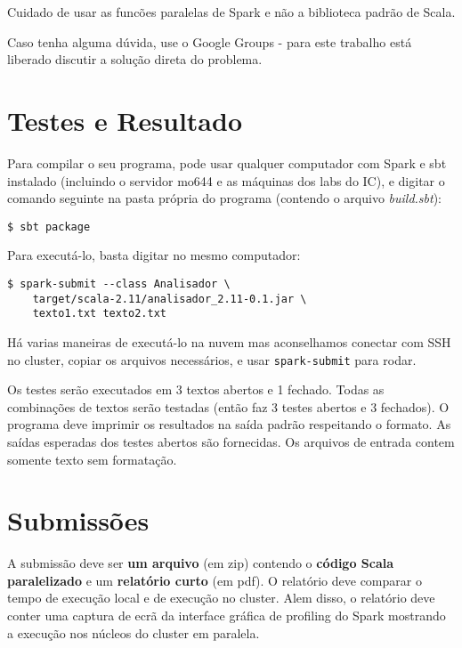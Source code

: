 \documentclass[a4paper,12pt]{scrartcl}
\begin{document}
Cuidado de usar as funcões paralelas de Spark e não a biblioteca padrão de Scala.

Caso tenha alguma dúvida, use o Google Groups - para este trabalho está liberado discutir a solução direta do problema. 

\section{Testes e Resultado}

Para compilar o seu programa, pode usar qualquer computador com Spark e sbt instalado (incluindo o servidor mo644 e as máquinas dos labs do IC), e digitar o comando seguinte na pasta própria do programa (contendo o arquivo \textit{build.sbt}):
\begin{lstlisting}[style=BashInputStyle]
$ sbt package
\end{lstlisting}

Para executá-lo, basta digitar no mesmo computador:
\begin{lstlisting}[style=BashInputStyle]
$ spark-submit --class Analisador \
	target/scala-2.11/analisador_2.11-0.1.jar \
	texto1.txt texto2.txt
\end{lstlisting}

Há varias maneiras de executá-lo na nuvem mas aconselhamos conectar com SSH no cluster, copiar os arquivos necessários, e usar \lstinline[style=BashInputStyle]|spark-submit| para rodar.

Os testes serão executados em 3 textos abertos e 1 fechado. Todas as combinações de textos serão testadas (então faz 3 testes abertos e 3 fechados). O programa deve imprimir os resultados na saída padrão respeitando o formato. As saídas esperadas dos testes abertos são fornecidas. Os arquivos de entrada contem somente texto sem formatação.

\section{Submissões}

A submissão deve ser \textbf{um arquivo} (em zip) contendo o \textbf{código Scala paralelizado} e um \textbf{relatório curto} (em pdf). O relatório deve comparar o tempo de execução local e de execução no cluster. Alem disso, o relatório deve conter uma captura de ecrã da interface gráfica de profiling do Spark mostrando a execução nos núcleos do cluster em paralela.
\end{document}
